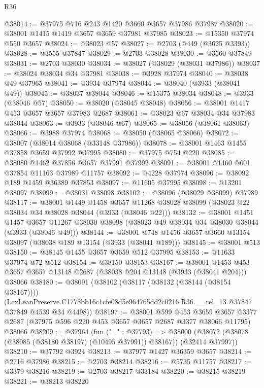 \begin{lexlean}{R36}
\begin{coremodule}
@38014 := @37975 @716 @243 @1420 @3660 @3657 @37986 @37987
@38020 := @38001 @1415 @1419 @3657 @3659 @37981 @37985
@38023 := @15350 @37974 @550 @3657
@38024 := @38023 @57
@38027 := @2703 (@449 (@3625 @3393))
@38028 := @3555 @37847
@38029 := @2703 @38028
@38030 := @3560 @37849
@38031 := @2703 @38030
@38034 := @38027 (@38029 (@38031 @37986))
@38037 := @38024 @38034 @34 @37981
@38038 := @3928 @37974
@38040 := @38038 @49 @37965
@38041 := @3934 @37974
@38044 := @38040 (@3933 (@38041 @49))
@38045 := @38037 @38044
@38046 := @15375 @38034
@38048 := @3933 (@38046 @57)
@38050 := @38020 (@38045 @38048)
@38056 := @38001 @1417 @453 @3657 @3657 @37983 @2687
@38061 := @38023 @67 @38034 @34 @37983 @38044
@38063 := @3933 (@38046 @67)
@38065 := @38056 (@38061 @38063)
@38066 := @3988 @37974
@38068 := @38050 (@38065 @38066)
@38072 := @38007 (@38014 @38068 (@33148 @37986))
@38078 := @38001 @1463 @1455 @37858 @3659 @37992 @37995
@38080 := @37975 @754 @220
@38085 := @38080 @1462 @37856 @3657 @37991 @37992
@38091 := @38001 @1460 @601 @37854 @11163 @37989 @11757
@38092 := @4228 @37974
@38096 := @38092 @189 @1459 @36389 @37853
@38097 := @11605 @37995
@38098 := @13201 @38097
@38099 := @38031 @38098
@38102 := @38096 (@38029 @38099) @37989
@38117 := @38001
    @1449
    @1458
    @3657
    @11268
    @38028
    @38099
    (@38023 @22 @38034 @34 @38028 @38044 (@3933 (@38046 @22)))
@38132 := @38001
    @1451
    @1457
    @3657
    @11267
    @38030
    @38098
    (@38023 @49 @38034 @34 @38030 @38044 (@3933 (@38046 @49)))
@38144 := @38001 @748 @1456 @3657 @3660 @13154 @38097 (@38038 @189 @13154 (@3933 (@38041 @189)))
@38145 := @38001 @513
@38150 := @38145 @1455 @3657 @3659 @512 @37995
@38153 := @11633 @37974 @72 @512
@38154 := @38150 @38153
@38167 := @38001
    @1453
    @453
    @3657
    @3657
    @13148
    @2687
    (@38038 @204 @13148 (@3933 (@38041 @204)))
    @38066
@38180 := @38091
    (@38102
      (@38117 (@38132 (@38144 (@38154 @38167))))
      (LexLeanPreserve.C1778bb16c1cfe08d5e964765dd2c0216.R36.__rel_13
        @37847
        @37849
        @4539
        @34
        @4498))
@38197 := @38001
    @599
    @453
    @3659
    @3657
    @3377
    @2687
    (@37975 @596 @220 @453 @3657 @3657 @2687 @3377 @38066 @11795)
    @38066
@38209 := @37964
    (fun ("_" : @37793) =>
    @38000 (@38072 (@38078 (@38085 (@38180 @38197) (@10495 @37991)) @38167)) (@32414 @37997))
@38210 := @37792 @3924
@38213 := @37977 @1427 @36359 @3657
@38214 := @2716 @37986
@38215 := @2703 @38214
@38216 := @5735 @11757
@38217 := @3379 @38216
@38219 := @2703 @38217 @33184
@38220 := @38215 @38219
@38221 := @38213 @38220

\end{coremodule}
\end{lexlean}
